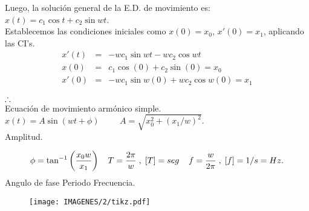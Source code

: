 \documentclass{beamer}
\begin{document}
\begin{frame}[t]
	\begin{block}{}
		Luego, la solución general de la E.D. de movimiento es: \(x(t) = c_1 \cos t + c_2 \sin wt\). \\[2mm]
		Establecemos las condiciones iniciales como \(x(0) = x_0\), \(x' (0) = x_1\), aplicando las CI's.
		\[
			\begin{array}{rcl}
				x' (t) & = & -w c_1 \sin w t -w c_2 \cos w t \\[2mm]
				x(0) & = & c_1 \cos (0)+c_2 \sin (0) = x_0 \\[2mm]
				x'(0) & = & -wc_1 \sin w(0)+wc_2 \cos w(0) = x_1
			\end{array}
		\]
		\begin{center}
			\(\therefore \hspace{5mm}\) \color{red} \\
			\hspace{5mm} \footnotesize Ecuación de movimiento armónico simple. \\[2mm]
			\color{black} \normalsize \(x(t)= A \sin (wt+ \phi ) \hspace{1cm} A = \sqrt{x_0^2+(x_1/w) ^2}\).\\
			\color{red} \hspace{4cm} \footnotesize Amplitud.
		\end{center}
	\end{block}
\end{frame}

\begin{frame}[t]
	\begin{block}{}
		\[
			\phi = \tan ^{-1} \bigg(\dfrac{x_0w}{x_1}\bigg) \hspace{4mm} T = \dfrac{2 \pi}{w} \;,\;  [T] = seg \hspace{4mm} f = \dfrac{w}{2 \pi} \;,\; [f] = 1/s = Hz.
		\]
		\color{red} \hspace{1cm} \footnotesize Angulo de fase \hspace{1.3cm} Periodo \hspace{1.5cm} Frecuencia.
		\begin{figure}[hbt!]
			\centering
			\texttt{[image: IMAGENES/2/tikz.pdf]}
		\end{figure}
	\end{block}
\end{frame}
\end{document}
